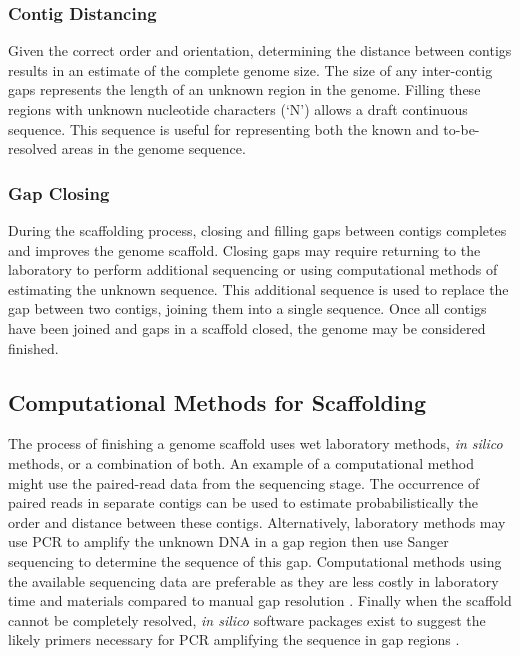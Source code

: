 \documentclass[10pt]{bmc_article}
\newenvironment{bmcformat}{\begin{raggedright}\baselineskip20pt\sloppy\setboolean{publ}{false}}{\end{raggedright}\baselineskip20pt\sloppy}
\begin{document}
\begin{bmcformat}
\subsubsection*{Contig Distancing} %

Given the correct order and orientation, determining the distance between
contigs results in an estimate of the complete genome size. The size of any
inter-contig gaps represents the length of an unknown region in the genome.
Filling these regions with unknown nucleotide characters (`N') allows a draft
continuous sequence. This sequence is useful for representing both the known
and to-be-resolved areas in the genome sequence.

\subsubsection*{Gap Closing} %

During the scaffolding process, closing and filling gaps between contigs
completes and improves the genome scaffold. Closing gaps may require returning
to the laboratory to perform additional sequencing or using computational
methods of estimating the unknown sequence. This additional sequence is used
to replace the gap between two contigs, joining them into a single sequence.
Once all contigs have been joined and gaps in a scaffold closed, the genome
may be considered finished.

\subsection*{Computational Methods for Scaffolding} %

The process of finishing a genome scaffold uses wet laboratory methods,
\emph{in silico} methods, or a combination of both. An example of a
computational method might use the paired-read data from the sequencing stage.
The occurrence of paired reads in separate contigs can be used to estimate
probabilistically the order and distance between these contigs. Alternatively,
laboratory methods may use PCR to amplify the unknown DNA in a gap region then
use Sanger sequencing to determine the sequence of this gap. Computational
methods using the available sequencing data are preferable as they are less
costly in laboratory time and materials compared to manual gap resolution
\cite{nagarajan2010}. Finally when the scaffold cannot be completely resolved,
\emph{in silico} software packages exist to suggest the likely primers
necessary for PCR amplifying the sequence in gap regions \cite{gordon2001}. \pb


\end{bmcformat}
\end{document}
